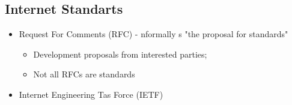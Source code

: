\documentclass{article}
\begin{document}
\subsection*{Internet Standarts}

\begin{itemize}
	\item Request For Comments (RFC) - nformally s "the proposal for standards"
	      \begin{itemize}
		      \item Development proposals from interested parties;
		      \item Not all RFCs are standards
	      \end{itemize}
	\item Internet Engineering Tas Force (IETF)
\end{itemize}
\end{document}

